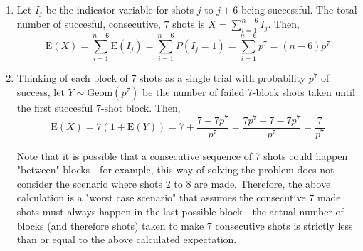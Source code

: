 \begin{enumerate}[label=(\alph*)]
\item Let $I_{j}$ be the indicator variable for shots $j$ to $j+6$ being
successful. The total number of succesful, consecutive, $7$ shots is $X = \sum_
{i=1}^{n-6}I_{j}$. Then, $$\text{E}(X) = \sum_{i=1}^{n-6}\text{E}(I_{j}) = \sum_
{i=1}^{n-6}P(I_{j}=1) = \sum_{i=1}^{n-6}p^{7} = (n-6)p^{7}$$

\item Thinking of each block of $7$ shots as a single trial with probability $p^
{7}$ of success, let $Y \sim \text{Geom}(p^{7})$ be the number of
failed $7$-block shots taken until the first succesful $7$-shot block. Then, $$
\text{E}(X) = 7(1 + \text{E}(Y)) = 7 + \frac{7-7p^{7}}{p^{7}} = \frac{7p^{7} + 7
- 7p^{7}}{p^{7}} = \frac{7}{p^{7}}$$ 

Note that it is possible that a consecutive sequence of 7 shots could happen "between" blocks - for example, this way of solving the problem does not consider the scenario where shots 2 to 8 are made. Therefore, the above calculation is a "worst case scenario" that assumes the consecutive 7 made shots must always happen in the last possible block - the actual number of blocks (and therefore shots) taken to make 7 consecutive shots is strictly less than or equal to the above calculated expectation. 
\end{enumerate}
